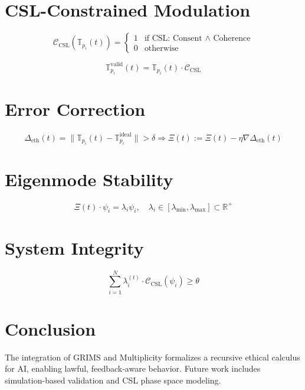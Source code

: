 \documentclass[12pt]{article}
\begin{document}
\section{CSL-Constrained Modulation}
\[
\mathcal{C}_{\text{CSL}}(\mathbb{T}_{p_i}(t)) =
\begin{cases}
1 & \text{if CSL: Consent $\land$ Coherence} \\
0 & \text{otherwise}
\end{cases}
\]

\[ \mathbb{T}_{p_i}^{\text{valid}}(t) = \mathbb{T}_{p_i}(t) \cdot \mathcal{C}_{\text{CSL}} \]

\section{Error Correction}
\[ \Delta_{\text{eth}}(t) = \|\mathbb{T}_{p_i}(t) - \mathbb{T}_{p_i}^{\text{ideal}}\| > \delta \Rightarrow \Xi(t) := \Xi(t) - \eta \nabla \Delta_{\text{eth}}(t) \]

\section{Eigenmode Stability}
\[ \Xi(t) \cdot \psi_i = \lambda_i \psi_i, \quad \lambda_i \in [\lambda_{\text{min}}, \lambda_{\text{max}}] \subset \mathbb{R}^{+} \]

\section{System Integrity}
\[ \sum_{i=1}^{N} \lambda_i^{(t)} \cdot \mathcal{C}_{\text{CSL}}(\psi_i) \geq \theta \]

\section{Conclusion}
The integration of GRIMS and Multiplicity formalizes a recursive ethical calculus for AI, enabling lawful, feedback-aware behavior. Future work includes simulation-based validation and CSL phase space modeling.
\end{document}
